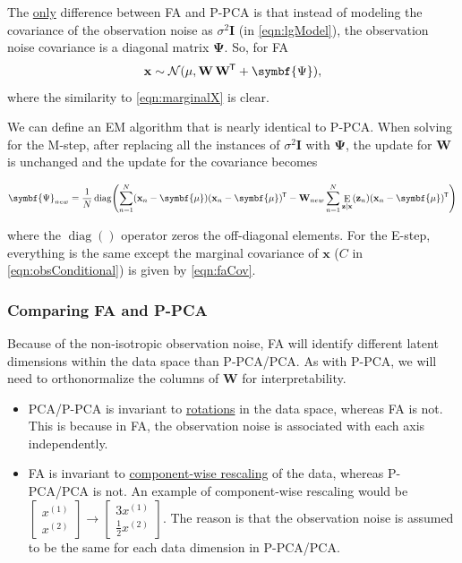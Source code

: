 \documentclass[11pt]{article}
\DeclareMathOperator{\E}{E}
\DeclareMathOperator{\diag}{diag}
\newcommand{\xb}{\mathbf{x}}
\newcommand{\zb}{\mathbf{z}}
\newcommand{\ub}{\symbf{\mu}}
\newcommand{\Wb}{\mathbf{W}}
\newcommand*{\tran}{^{\mkern-1.5mu\mathsf{T}}}
\begin{document}
The \underline{only} difference between FA and P-PCA is that instead of
modeling the covariance of the observation noise as $\sigma^2 \mathbf{I}$ (in
\eqref{eqn:lgModel}), the observation noise covariance is a diagonal matrix
$\symbf{\Psi}$. So, for FA
\begin{equation}
  \xb \sim \mathcal{N}(\mu, \Wb\,\Wb\tran + \symbf{\Psi}),
  \label{eqn:faCov}
\end{equation}
where the similarity to \eqref{eqn:marginalX} is clear.

We can define an EM algorithm that is nearly identical to P-PCA. When solving for
the M-step, after replacing all the instances of $\sigma^2 \mathbf{I}$ with
$\symbf{\Psi}$, the update for $\Wb$ is unchanged and the update for the
covariance becomes
\begin{framed}
  \begin{equation}
    \symbf{\Psi}_{new} = \frac{1}{N} \diag \Biggl(
      \sum_{n=1}^N (\xb_n - \ub) (\xb_n - \ub) \tran
      - \Wb_{new}\sum_{n=1}^N \E_{\zb\mid\xb}(\zb_n)(\xb_n - \ub)\tran
    \Biggr)
  \end{equation}
\end{framed}
where the $\diag()$ operator zeros the off-diagonal elements. For the E-step,
everything is the same except the marginal covariance of $\xb$ ($C$ in
\eqref{eqn:obsConditional}) is given by \eqref{eqn:faCov}.

\subsubsection{Comparing FA and P-PCA}
Because of the non-isotropic observation noise, FA will identify different
latent dimensions within the data space than P-PCA/PCA. As with P-PCA, we will
need to orthonormalize the columns of $\Wb$ for interpretability.
\begin{itemize}
  \item PCA/P-PCA is invariant to \underline{rotations} in the data space,
  whereas FA is not. This is because in FA, the observation noise is associated
  with each axis independently.

  \item FA is invariant to \underline{component-wise rescaling} of the data,
  whereas P-PCA/PCA is not. An example of component-wise rescaling would be
  $\begin{bmatrix}x^{(1)} \\ x^{(2)}\end{bmatrix} \rightarrow
  \begin{bmatrix}3 x^{(1)} \\ \frac{1}{2} x^{(2)}\end{bmatrix}$. The reason is
  that the observation noise is assumed to be the same for each data dimension
  in P-PCA/PCA.
\end{itemize}
\end{document}
